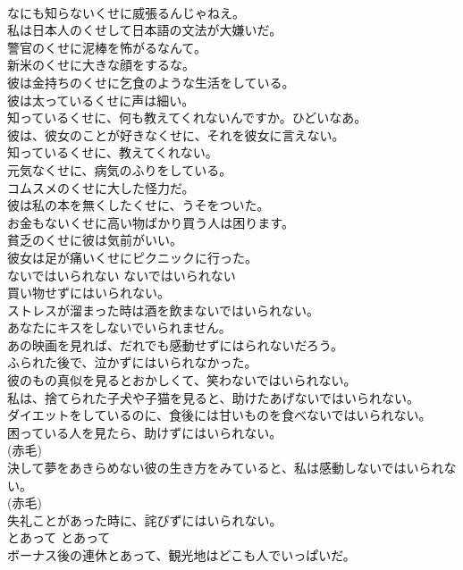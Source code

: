\documentclass[8pt]{extreport}
\begin{document}
\begin{CJK}{UTF8}{min}
\\	なにも知らないくせに威張るんじゃねえ。  
\\	私は日本人のくせして日本語の文法が大嫌いだ。  
\\	警官のくせに泥棒を怖がるなんて。  
\\	新米のくせに大きな顔をするな。  
\\	彼は金持ちのくせに乞食のような生活をしている。  
\\	彼は太っているくせに声は細い。  
\\	知っているくせに、何も教えてくれないんですか。ひどいなあ。  
\\	彼は、彼女のことが好きなくせに、それを彼女に言えない。  
\\	知っているくせに、教えてくれない。   
\\	元気なくせに、病気のふりをしている。  
\\	コムスメのくせに大した怪力だ。  
\\	彼は私の本を無くしたくせに、うそをついた。  
\\	お金もないくせに高い物ばかり買う人は困ります。  
\\	貧乏のくせに彼は気前がいい。   
\\	彼女は足が痛いくせにピクニックに行った。  
\\	ないではいられない	ないではいられない	
\\	買い物せずにはいられない。   
\\	ストレスが溜まった時は酒を飲まないではいられない。  
\\	あなたにキスをしないでいられません。   
\\	あの映画を見れば、だれでも感動せずにはられないだろう。  
\\	ふられた後で、泣かずにはいられなかった。  
\\	彼のもの真似を見るとおかしくて、笑わないではいられない。  
\\	私は、捨てられた子犬や子猫を見ると、助けたあげないではいられない。   
\\	ダイエットをしているのに、食後には甘いものを食べないではいられない。  
\\	困っている人を見たら、助けずにはいられない。  
\\	(赤毛)
\\	決して夢をあきらめない彼の生き方をみていると、私は感動しないではいられない。  
\\	(赤毛)
\\	失礼ことがあった時に、詫びずにはいられない。  
\\	とあって	とあって	
\\	ボーナス後の連休とあって、観光地はどこも人でいっぱいだ。  

\end{CJK}
\end{document}
